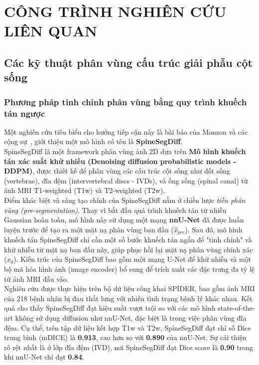 \chapter{CÔNG TRÌNH NGHIÊN CỨU LIÊN QUAN}
\section{Các kỹ thuật phân vùng cấu trúc giải phẫu cột sống}
\subsection{Phương pháp tinh chỉnh phân vùng bằng quy trình khuếch tán ngược}
Một nghiên cứu tiêu biểu cho hướng tiếp cận này là bài báo của Monzon và các cộng sự~\cite{monzon2024diffusion}, giới thiệu một mô hình có tên là \textbf{SpineSegDiff}. \\

SpineSegDiff là một framework phân vùng ảnh 2D dựa trên \textbf{Mô hình khuếch tán xác suất khử nhiễu (Denoising diffusion probabilistic models - DDPM)}, được thiết kế để phân vùng các cấu trúc cột sống như đốt sống (vertebrae), đĩa đệm (intervertebral discs - IVDs), và ống sống (spinal canal) từ ảnh MRI T1-weighted (T1w) và T2-weighted (T2w).\\

Điểm khác biệt và sáng tạo chính của SpineSegDiff nằm ở chiến lược \textit{tiền phân vùng (pre-segmentation)}. Thay vì bắt đầu quá trình khuếch tán từ nhiễu Gaussian hoàn toàn, mô hình này sử dụng một mạng \textbf{nnU-Net} đã được huấn luyện trước để tạo ra một mặt nạ phân vùng ban đầu ($\hat{x}_{pre}$). Sau đó, mô hình khuếch tán SpineSegDiff chỉ cần một số bước khuếch tán ngắn để "tinh chỉnh" và khử nhiễu từ mặt nạ ban đầu này, giúp phục hồi lại mặt nạ phân vùng chính xác ($x_0$). Kiến trúc của SpineSegDiff bao gồm một mạng U-Net để khử nhiễu và một bộ mã hóa hình ảnh (image encoder) bổ sung để trích xuất các đặc trưng đa tỷ lệ từ ảnh MRI đầu vào.\\

Nghiên cứu được thực hiện trên bộ dữ liệu công khai SPIDER, bao gồm ảnh MRI của 218 bệnh nhân bị đau thắt lưng với nhiều tình trạng bệnh lý khác nhau. Kết quả cho thấy SpineSegDiff đạt hiệu suất vượt trội so với các mô hình state-of-the-art không sử dụng diffusion như nnU-Net, đặc biệt là trong việc phân vùng đĩa đệm. Cụ thể, trên tập dữ liệu kết hợp T1w và T2w, SpineSegDiff đạt chỉ số Dice trung bình (mDICE) là \textbf{0.913}, cao hơn so với \textbf{0.890} của nnU-Net. Sự cải thiện rõ rệt nhất là ở lớp đĩa đệm (IVD), nơi SpineSegDiff đạt Dice score là \textbf{0.90} trong khi nnU-Net chỉ đạt \textbf{0.84}.\\

